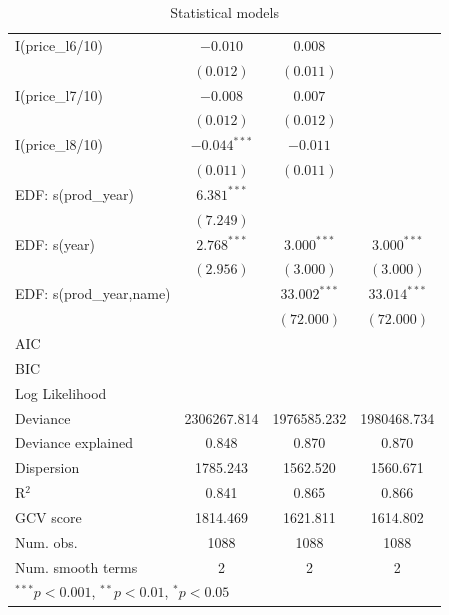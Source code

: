 \documentclass[11pt]{article}
\begin{document}
\begin{table}
\begin{center}
\begin{tabular}{l c c c }
I(price\_l6/10)                  & $-0.010$       & $0.008$        &                \\
                                 & $(0.012)$      & $(0.011)$      &                \\
I(price\_l7/10)                  & $-0.008$       & $0.007$        &                \\
                                 & $(0.012)$      & $(0.012)$      &                \\
I(price\_l8/10)                  & $-0.044^{***}$ & $-0.011$       &                \\
                                 & $(0.011)$      & $(0.011)$      &                \\
EDF: s(prod\_year)               & $6.381^{***}$  &                &                \\
                                 & $(7.249)$      &                &                \\
EDF: s(year)                     & $2.768^{***}$  & $3.000^{***}$  & $3.000^{***}$  \\
                                 & $(2.956)$      & $(3.000)$      & $(3.000)$      \\
EDF: s(prod\_year,name)          &                & $33.002^{***}$ & $33.014^{***}$ \\
                                 &                & $(72.000)$     & $(72.000)$     \\
\hline
AIC                              &                &                &                \\
BIC                              &                &                &                \\
Log Likelihood                   &                &                &                \\
Deviance                         & 2306267.814    & 1976585.232    & 1980468.734    \\
Deviance explained               & 0.848          & 0.870          & 0.870          \\
Dispersion                       & 1785.243       & 1562.520       & 1560.671       \\
R$^2$                            & 0.841          & 0.865          & 0.866          \\
GCV score                        & 1814.469       & 1621.811       & 1614.802       \\
Num. obs.                        & 1088           & 1088           & 1088           \\
Num. smooth terms                & 2              & 2              & 2              \\
\hline
\multicolumn{4}{l}{\scriptsize{$^{***}p<0.001$, $^{**}p<0.01$, $^*p<0.05$}}
\end{tabular}
\caption{Statistical models}
\label{GAM_model_table}
\end{center}
\end{table}
 
\end{document}
